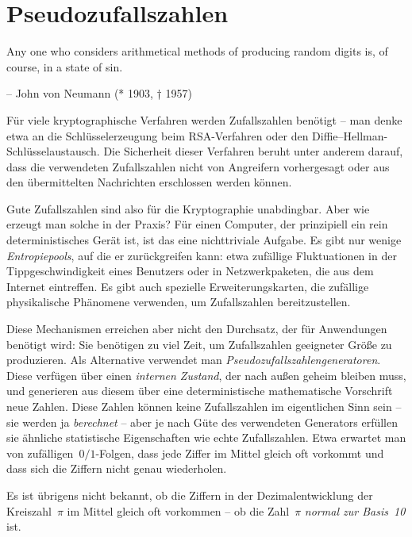 \documentclass{../zirkelblatt}
\newcommand{\head}[1]{\section*{\rmfamily #1}}%
\begin{document}
\head{Pseudozufallszahlen}

\begin{trivlist}\setlength\leftskip{3cm}\setlength\rightskip{0pt}\item
Any one who considers arithmetical methods of producing random digits is, of
course, in a state of sin.

-- John von Neumann (* 1903, † 1957)
\end{trivlist}

Für viele kryptographische Verfahren werden Zufallszahlen benötigt -- man denke
etwa an die Schlüsselerzeugung beim RSA-Verfahren oder den
Diffie--Hellman-Schlüsselaustausch. Die Sicherheit dieser Verfahren beruht
unter anderem darauf, dass die verwendeten Zufallszahlen nicht von Angreifern
vorhergesagt oder aus den übermittelten Nachrichten erschlossen werden können.

Gute Zufallszahlen sind also für die Kryptographie unabdingbar. Aber wie
erzeugt man solche in der Praxis? Für einen Computer, der prinzipiell ein rein
deterministisches Gerät ist, ist das eine nichttriviale Aufgabe. Es gibt nur
wenige \emph{Entropiepools}, auf die er zurückgreifen kann: etwa zufällige
Fluktuationen in der Tippgeschwindigkeit eines Benutzers oder in
Netzwerkpaketen, die aus dem Internet eintreffen. Es gibt auch spezielle
Erweiterungskarten, die zufällige physikalische Phänomene verwenden, um
Zufallszahlen bereitzustellen.

Diese Mechanismen erreichen aber nicht den Durchsatz, der für Anwendungen
benötigt wird: Sie benötigen zu viel Zeit, um Zufallszahlen geeigneter Größe zu
produzieren. Als Alternative verwendet man
\emph{Pseudozufallszahlengeneratoren}. Diese verfügen über einen \emph{internen
Zustand}, der nach außen geheim bleiben muss, und generieren aus diesem über
eine deterministische mathematische Vorschrift neue Zahlen. Diese Zahlen können
keine Zufallszahlen im eigentlichen Sinn sein -- sie werden ja \emph{berechnet}
-- aber je nach Güte des verwendeten Generators erfüllen sie ähnliche
statistische Eigenschaften wie echte Zufallszahlen.
Etwa erwartet man von zufälligen~$0/1$-Folgen, dass jede Ziffer im Mittel
gleich oft vorkommt und dass sich die Ziffern nicht genau wiederholen.

Es ist übrigens nicht bekannt, ob die Ziffern in der Dezimalentwicklung der
Kreiszahl~$\pi$ im Mittel gleich oft vorkommen -- ob die Zahl~$\pi$
\emph{normal zur Basis~10} ist.
\end{document}
